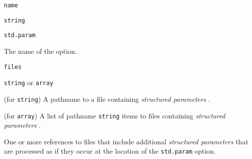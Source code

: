 \vspace{\baselineskip}

\begin{itemdescr}

	\pnum \fldname \verb|name|

	\pnum \fldtype \verb|string|

	\pnum \fldval \verb|std.param|

	\pnum \flddesc
	The name of the option.

\end{itemdescr}

\vspace{\baselineskip}

\begin{itemdescr}

	\pnum \fldname \verb|files|

	\pnum \fldtype \verb|string| or \verb|array|

	\pnum \fldval (for \verb|string|)
	A pathname to a file containing \emph{structured parameters}
	.

	\pnum \fldval (for \verb|array|)
	A list of pathname \verb|string| items to files containing \emph{structured 
	parameters} .

	\pnum \flddesc
	One or more references to files that include additional \emph{structured 
	parameters}  that are processed as if they occur at the 
	location of the \verb|std.param| option.

\end{itemdescr}
